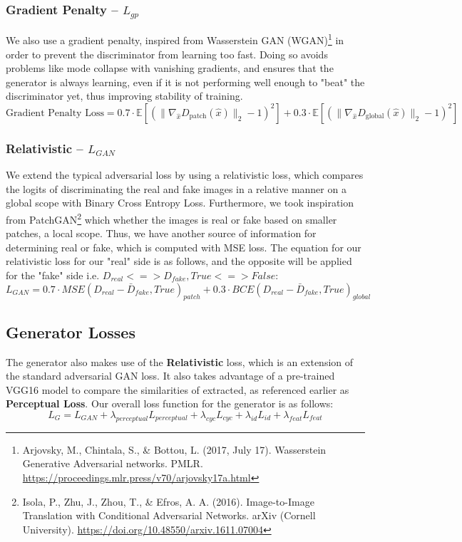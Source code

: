 \documentclass[twoside,english,notitlepage]{report}
\begin{document}
\subsubsection{Gradient Penalty – $L_{gp}$}
We also use a gradient penalty, inspired from Wasserstein GAN (WGAN)\footnote{Arjovsky, M., Chintala, S., \& Bottou, L. (2017, July 17). Wasserstein Generative Adversarial networks. PMLR. \href{https://proceedings.mlr.press/v70/arjovsky17a.html}{https://proceedings.mlr.press/v70/arjovsky17a.html}} in order to prevent the discriminator from learning too fast. Doing so avoids problems like mode collapse with vanishing gradients, and ensures that the generator is always learning, even if it is not performing well enough to "beat" the discriminator yet, thus improving stability of training.
\begin{equation*}
    \text{Gradient Penalty Loss} = 0.7 \cdot \mathbb{E} \left[ \left( \| \nabla_{\hat{x}} D_{\text{patch}} (\hat{x}) \|_2 - 1 \right)^2 \right] + 0.3 \cdot \mathbb{E} \left[ \left( \| \nabla_{\hat{x}} D_{\text{global}} (\hat{x}) \|_2 - 1 \right)^2 \right]
\end{equation*}

\subsubsection{Relativistic – $L_{GAN}$}
We extend the typical adversarial loss by using a relativistic loss, which compares the logits of discriminating the real and fake images in a relative manner on a global scope with Binary Cross Entropy Loss. Furthermore, we took inspiration from PatchGAN\footnote{Isola, P., Zhu, J., Zhou, T., \& Efros, A. A. (2016). Image-to-Image Translation with Conditional Adversarial Networks. arXiv (Cornell University). \href{https://doi.org/10.48550/arxiv.1611.07004}{https://doi.org/10.48550/arxiv.1611.07004}} which whether the images is real or fake based on smaller patches, a local scope. Thus, we have another source of information for determining real or fake, which is computed with MSE loss. The equation for our relativistic loss for our "real" side is as follows, and the opposite will be applied for the "fake" side i.e. $D_{real} <=> D_{fake}, True <=> False$:
\begin{equation}
    L_{GAN} = 0.7 \cdot MSE(D_{real} - \bar{D}_{fake}, True)_{patch} + 0.3 \cdot BCE(D_{real} - \bar{D}_{fake}, True)_{global}
\end{equation}

\subsection{Generator Losses}
The generator also makes use of the \textbf{Relativistic} loss, which is an extension of the standard adversarial GAN loss. It also takes advantage of a pre-trained VGG16 model to compare the similarities of extracted, as referenced earlier as \textbf{Perceptual Loss}. Our overall loss function for the generator is as follows:
\begin{equation}
    L_{G} = L_{GAN} + \lambda_{perceptual} L_{perceptual} + \lambda_{cyc} L_{cyc} + \lambda_{id} L_{id} + \lambda_{feat} L_{feat}
\end{equation}
\end{document}
